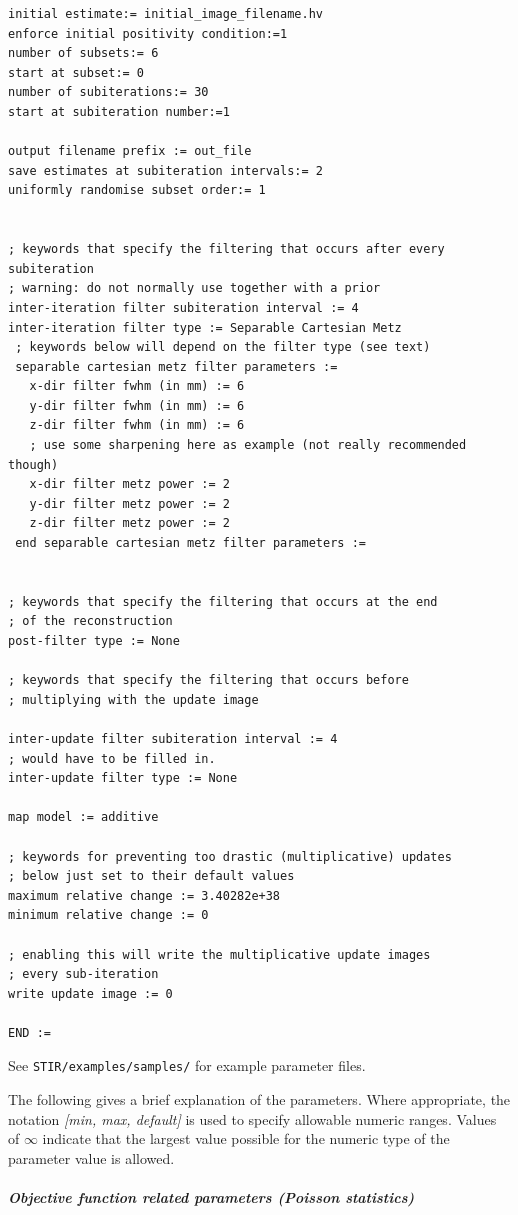 \documentclass{article}
\newcommand{\subsubsubsubsection}[1]{\subparagraph{#1} \mbox{} \\}
\begin{document}
{\begin{verbatim}
initial estimate:= initial_image_filename.hv
enforce initial positivity condition:=1
number of subsets:= 6
start at subset:= 0
number of subiterations:= 30
start at subiteration number:=1

output filename prefix := out_file
save estimates at subiteration intervals:= 2
uniformly randomise subset order:= 1


; keywords that specify the filtering that occurs after every subiteration
; warning: do not normally use together with a prior
inter-iteration filter subiteration interval := 4
inter-iteration filter type := Separable Cartesian Metz
 ; keywords below will depend on the filter type (see text)
 separable cartesian metz filter parameters := 
   x-dir filter fwhm (in mm) := 6 
   y-dir filter fwhm (in mm) := 6 
   z-dir filter fwhm (in mm) := 6 
   ; use some sharpening here as example (not really recommended though)
   x-dir filter metz power := 2 
   y-dir filter metz power := 2 
   z-dir filter metz power := 2 
 end separable cartesian metz filter parameters := 


; keywords that specify the filtering that occurs at the end
; of the reconstruction
post-filter type := None

; keywords that specify the filtering that occurs before 
; multiplying with the update image

inter-update filter subiteration interval := 4
; would have to be filled in.
inter-update filter type := None

map model := additive

; keywords for preventing too drastic (multiplicative) updates
; below just set to their default values
maximum relative change := 3.40282e+38
minimum relative change := 0

; enabling this will write the multiplicative update images 
; every sub-iteration
write update image := 0

END :=
\end{verbatim}
}

See \texttt{STIR/examples/samples/} for example parameter files.

The following gives a brief explanation of the parameters. Where 
appropriate, the notation \textit{[min, max, default]} is used to 
specify allowable numeric ranges. Values of \textit{\ensuremath{\infty}} indicate 
that the largest value possible for the numeric type of the parameter 
value is allowed.

{ \subsubsubsubsection{Objective function related parameters (Poisson statistics)}
}
\label{sec:PoissonProjectionDataObjectiveFunction}
\end{document}
